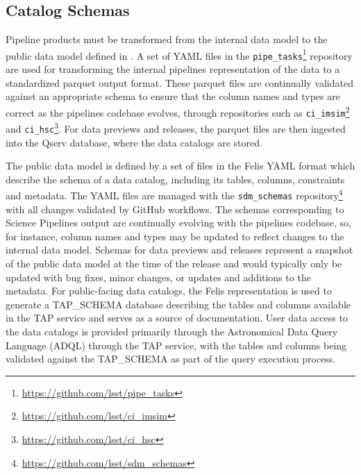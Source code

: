 \subsection{Catalog Schemas}
\label{sec:schemas}

Pipeline products must be transformed from the internal data model to the public data model defined in \citet{LSE-163}.
A set of YAML files in the \texttt{pipe\_tasks}\footnote{\url{https://github.com/lsst/pipe\_tasks}} repository are used for transforming the internal pipelines representation of the data to a standardized parquet output format.
These parquet files are continually validated against an appropriate schema to ensure that the column names and types are correct as the pipelines codebase evolves, through repositories such as \texttt{ci\_imsim}\footnote{\url{https://github.com/lsst/ci\_imsim}} and \texttt{ci\_hsc}\footnote{\url{https://github.com/lsst/ci\_hsc}}.
For data previews and releases, the parquet files are then ingested into the Qserv database, where the data catalogs are stored.

The public data model is defined by a set of files in the Felis \citep{2024arXiv241209721M} YAML format which describe the schema of a data catalog, including its tables, columns, constraints and metadata.
The YAML files are managed with the \texttt{sdm\_schemas} repository\footnote{\url{https://github.com/lsst/sdm\_schemas}} with all changes validated by GitHub workflows.
The schemas corresponding to Science Pipelines output are continually evolving with the pipelines codebase, so, for instance, column names and types may be updated to reflect changes to the internal data model.
Schemas for data previews and releases represent a snapshot of the public data model at the time of the release and would typically only be updated with bug fixes, minor changes, or updates and additions to the metadata.
For public-facing data catalogs, the Felis representation is used to generate a TAP\_SCHEMA database describing the tables and columns available in the TAP service \citep{2019ivoa.spec.0927D} and serves as a source of documentation.
User data access to the data catalogs is provided primarily through the Astronomical Data Query Language (ADQL) through the TAP service, with the tables and columns being validated against the TAP\_SCHEMA as part of the query execution process.
